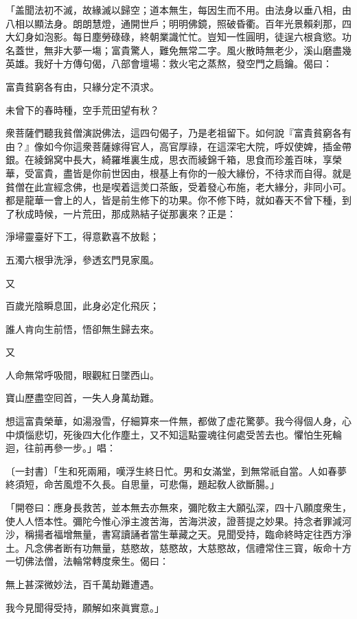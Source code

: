 \begin{myquote}[\markfont]
「盖聞法初不滅，故緣滅以歸空；道本無生，每因生而不用。由法身以垂八相，由八相以顯法身。朗朗慧燈，通開世戶；明明佛鏡，照破昏衢。百年光景賴刹那，四大幻身如泡影。每日塵勞碌碌，終朝業識忙忙。豈知一性圓明，徒逞六根貪慾。功名蓋世，無非大夢一塲；富貴驚人，難免無常二字。風火散時無老少，溪山磨盡幾英雄。我好十方傳句偈，八部會壇場：救火宅之蒸熬，發空門之扃鑰。偈曰：

{\kaishu
富貴貧窮各有由，只緣分定不湏求。

未曾下的春時種，空手荒田望有秋？
}

衆菩薩們聽我貧僧演説佛法，這四句偈子，乃是老祖留下。如何說『富貴貧窮各有由？』像如今你這衆菩薩嫁得官人，高官厚祿，在這深宅大院，呼奴使婢，插金帶銀。在綾錦窝中長大，綺羅堆裏生成，思衣而綾錦千箱，思食而珍羞百味，享榮華，受富貴，盡皆是你前世因由，根基上有你的一般大緣份，不待求而自得。就是貧僧在此宣經念佛，也是喫着這羙口茶飯，受着發心布施，老大緣分，非同小可。都是龍華一會上的人，皆是前生修下的功果。你不修下時，就如春天不曾下種，到了秋成時候，一片荒田，那成熟結子従那裏來？正是：

{\kaishu
淨埽靈臺好下工，得意歡喜不放鬆；

五濁六根爭洗淨，參透玄門見家風。
}

又

{\kaishu
百歲光陰瞬息囬，此身必定化飛灰；

誰人肯向生前悟，悟卻無生歸去來。
}

又

{\kaishu
人命無常呼吸間，眼觀紅日墜西山。

寶山歷盡空囘首，一失人身萬劫難。
}

想這富貴榮華，如湯潑雪，仔細算來一件無，都做了虚花驚夢。我今得個人身，心中煩惱悲切，死後四大化作塵土，又不知這點靈魂往何處受苦去也。懼怕生死輪迴，往前再參一步。」{\small{唱}}：

〔一封書〕{\kaishu「生和死兩厢，嘆浮生終日忙。男和女滿堂，到無常祇自當。人如春夢終須短，命苦風燈不久長。自思量，可悲傷，題起敎人欲斷腸。」}

「開卷曰：應身長救苦，並本無去亦無來，彌陀敎主大願弘深，四十八願度衆生，使人人悟本性。彌陀今惟心淨主渡苦海，苦海洪波，證菩提之妙果。持念者罪減河沙，稱揚者福增無量，書寫讀誦者當生華藏之天。見聞受持，臨命終時定往西方淨土。凡念佛者断有功無量，慈愍故，慈愍故，大慈愍故，信禮常住三寳，皈命十方一切佛法僧，法輪常轉度衆生。偈曰：

{\kaishu
無上甚深微妙法，百千萬劫難遭遇。

我今見聞得受持，願解如來眞實意。」
}


\end{myquote}
